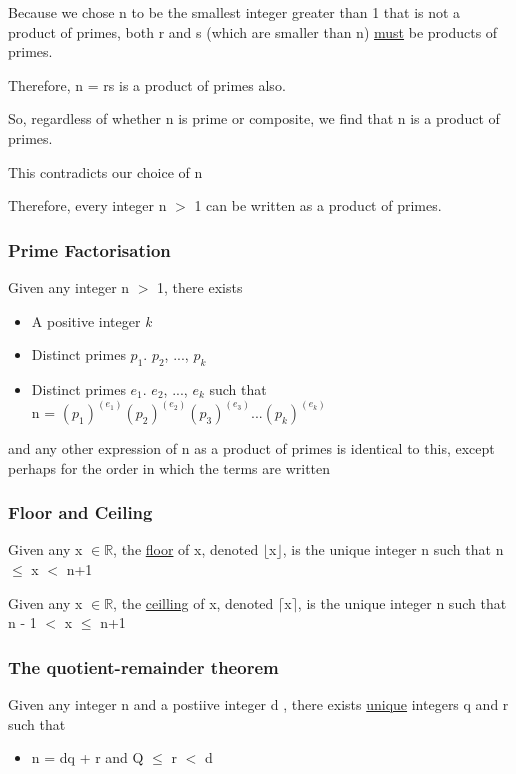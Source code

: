 \documentclass{article}
\begin{document}
Because we chose n to be the smallest integer greater than 1 that is not a product of primes, both r and s (which are smaller than n) \underline{must} be products of primes.

Therefore, n = rs is a product of primes also.

So, regardless of whether n is prime or composite, we find that n is a product of primes.

This contradicts our choice of n

Therefore, every integer n $>$ 1 can be written as a product of primes.

\subsubsection{Prime Factorisation}

Given any integer n $>$ 1, there exists
\begin{itemize}
\item A positive integer \textit{k}
\item Distinct primes $p_{1}$. $p_{2}$, ..., $p_{k}$
\item Distinct primes $e_{1}$. $e_{2}$, ..., $e_{k}$ such that \\
n = $(p_{1})^{(e_{1})}(p_{2})^{(e_{2})}(p_{3})^{(e_{3})} ... (p_{k})^{(e_{k})}$
\end{itemize}

and any other expression of n as a product of primes is identical to this, except perhaps for the order in which the terms are written

\subsubsection{Floor and Ceiling}

Given any x $\in \mathbb{R}$, the \underline{floor} of x, denoted $\lfloor$x$\rfloor$, is the unique integer n such that
n $\leq$ x $<$ n+1

Given any x $\in \mathbb{R}$, the \underline{ceilling} of x, denoted $\lceil$x$\rceil$, is the unique integer n such that
n - 1 $<$ x $\leq$ n+1

\subsubsection{The quotient-remainder theorem}

Given any integer n and a postiive integer d , there exists \underline{unique} integers q and r such that
\begin{itemize}
\item n = dq + r and Q $\leq$ r $<$ d
\end{itemize}
\end{document}
